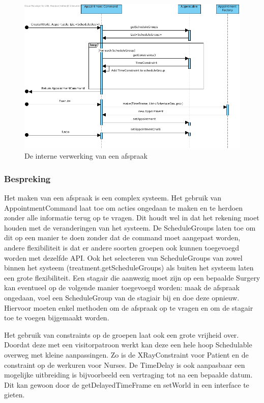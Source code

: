 \documentclass[a4paper]{article}
\begin{document}
\begin{figure}[h]
\centering
\includegraphics[width=\textwidth]{Pictures/MakeAppointment}
\caption{De interne verwerking van een afspraak}
\label{fig:makeappointment}
\end{figure}

\subsubsection{Bespreking}
Het maken van een afspraak is een complex systeem. Het gebruik van AppointmentCommand laat toe om acties ongedaan te maken en te herdoen zonder alle informatie terug op te vragen. Dit houdt wel in dat het rekening moet houden met de veranderingen van het systeem. De ScheduleGroups laten toe om dit op een manier te doen zonder dat de command moet aangepast worden, andere flexibiliteit is dat er andere soorten groepen ook kunnen toegevoegd worden met dezelfde API. Ook het selecteren van ScheduleGroups van zowel binnen het systeem (treatment.getScheduleGroups) als buiten het systeem laten een grote flexibiliteit. Een stagair die aanwezig moet zijn op een bepaalde Surgery kan eventueel op de volgende manier toegevoegd worden: maak de afspraak ongedaan, voel een ScheduleGroup van de stagiair bij en doe deze opnieuw. Hiervoor moeten enkel methoden om de afspraak op te vragen en om de stagair toe te voegen bijgemaakt worden. 

Het gebruik van constraints op de groepen laat ook een grote vrijheid over. Doordat deze met een visitorpatroon werkt kan deze een hele hoop Schedulable overweg met kleine aanpassingen. Zo is de XRayConstraint voor Patient en de constraint op de werkuren voor Nurses. De TimeDelay is ook aanpasbaar een mogelijke uitbreiding is bijvoorbeeld een vertraging tot na een bepaalde datum. Dit kan gewoon door de getDelayedTimeFrame en setWorld in een interface te gieten.
\end{document}
